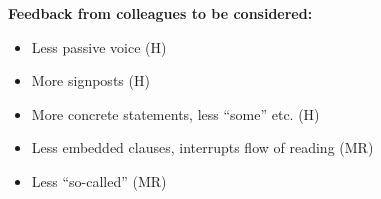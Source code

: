 \noindent
\textbf{Feedback from colleagues to be considered:}

\begin{itemize}
  \item
  Less passive voice (H)
  
  \item
  More signposts (H)
  
  \item
  More concrete statements, less ``some'' etc. (H)
  
  \item
  Less embedded clauses, interrupts flow of reading (MR)
  
  \item
  Less ``so-called'' (MR)
\end{itemize}

\cleardoublepage
